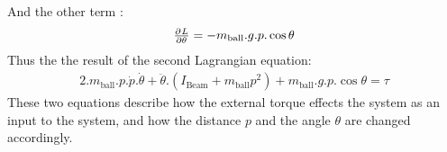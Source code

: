 And the other term :
\begin{equation}
	\begin{split}
		\pd{L}{\theta} = -m_{\text{ball}}.g.p.\cos{\theta}
	\end{split}
\end{equation}
Thus the the result of the second Lagrangian equation:
\begin{equation}
	\begin{split}
		2.m_{\text{ball}}.p.\dot{p}.\dot{\theta} + \ddot{\theta}.(I_{\text{Beam}} + m_{\text{ball}} p^2) + m_{\text{ball}}.g.p.\cos{\theta}  = \tau
	\end{split}
\end{equation}
These two equations describe how the external torque effects the system as an input to the system, and how the distance $p$ and the angle $\theta$ are changed accordingly.